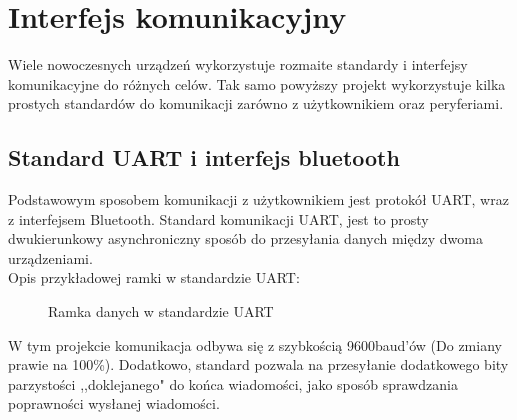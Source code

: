 \section{Interfejs komunikacyjny}
    \tab Wiele nowoczesnych urządzeń wykorzystuje rozmaite standardy i interfejsy komunikacyjne do różnych celów.
    Tak samo powyższy projekt wykorzystuje kilka prostych standardów do komunikacji zarówno z użytkownikiem oraz peryferiami.

    \subsection{Standard UART i interfejs bluetooth}
        \tab Podstawowym sposobem komunikacji z użytkownikiem jest protokół UART, wraz z interfejsem Bluetooth.
        Standard komunikacji UART, jest to prosty dwukierunkowy asynchroniczny sposób do przesyłania danych między dwoma urządzeniami.\\
        Opis przykładowej ramki w standardzie UART:
            
        \begin{figure}[!ht]
            \centering
            \caption{Ramka danych w standardzie UART}
        \end{figure}
% 
        \noindent
        W tym projekcie komunikacja odbywa się z szybkością 9600baud'ów (Do zmiany prawie na 100\%).
        Dodatkowo, standard pozwala na przesyłanie dodatkowego bity parzystości ,,doklejanego" do końca wiadomości, jako sposób sprawdzania poprawności wysłanej wiadomości.

